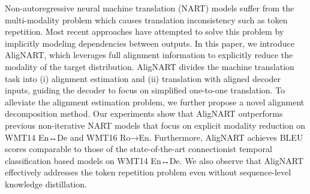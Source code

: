 Non-autoregressive neural machine translation (NART) models suffer from the multi-modality problem which causes translation inconsistency such as token repetition. Most recent approaches have attempted to solve this problem by implicitly modeling dependencies between outputs. In this paper, we introduce AligNART, which leverages full alignment information to explicitly reduce the modality of the target distribution. AligNART divides the machine translation task into (i) alignment estimation and (ii) translation with aligned decoder inputs, guiding the decoder to focus on simplified one-to-one translation. To alleviate the alignment estimation problem, we further propose a novel alignment decomposition method. Our experiments show that AligNART outperforms previous non-iterative NART models that focus on explicit modality reduction on WMT14 En↔De and WMT16 Ro→En. Furthermore, AligNART achieves BLEU scores comparable to those of the state-of-the-art connectionist temporal classification based models on WMT14 En↔De. We also observe that AligNART effectively addresses the token repetition problem even without sequence-level knowledge distillation.
